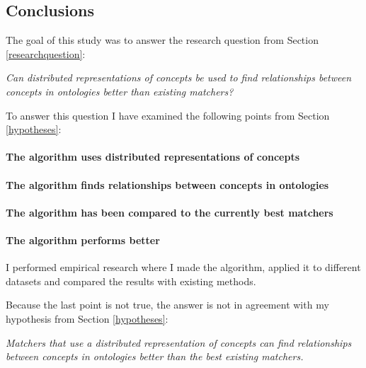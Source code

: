 \documentclass{article}
\begin{document}
 \subsection{Conclusions} \label{conclusions}

 
 The goal of this study was to answer the research question from Section \ref{researchquestion}:
 \begin{center}
 \textit{
 Can distributed representations of concepts be used to find relationships between concepts in ontologies better than existing matchers?
 }
 \end{center}
 
 To answer this question I have examined the following points from Section \ref{hypotheses}:
 
\paragraph{The algorithm uses distributed representations of concepts}
\paragraph{The algorithm finds relationships between concepts in ontologies}
\paragraph{The algorithm has been compared to the currently best matchers}
\paragraph{The algorithm performs better}
 I performed empirical research where I made the algorithm, applied it to different datasets and compared the results with existing methods.
 

 Because the last point is not true, the answer is not in agreement with my hypothesis from Section \ref{hypotheses}:
 
 \begin{center}
 \textit{Matchers that use a distributed representation of concepts can find relationships between concepts in ontologies better than the best existing matchers.}
 \end{center}
 
\end{document}
